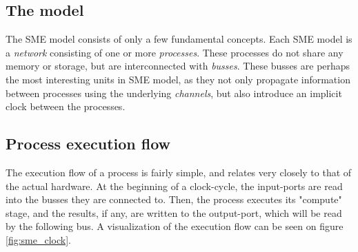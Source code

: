\subsection{The model}
The SME model consists of only a few fundamental concepts. Each SME model is 
a \textit{network} consisting of one or more \textit{processes}. These processes
do not share any memory or storage, but are interconnected with \textit{busses}.
These busses are perhaps the most interesting units in SME model, as they not
only propagate information between processes using the underlying \textit{channels},
but also introduce an implicit clock between the processes.\\

\subsection{Process execution flow}
The execution flow of a process is fairly simple, and relates very closely to 
that of the actual hardware. At the beginning of a clock-cycle, the input-ports 
are read into the busses they are connected to. Then, the process executes its
"compute" stage, and the results, if any, are written to the output-port, which
will be read by the following bus. A visualization of the execution flow can be
seen on figure \ref{fig:sme_clock}.
